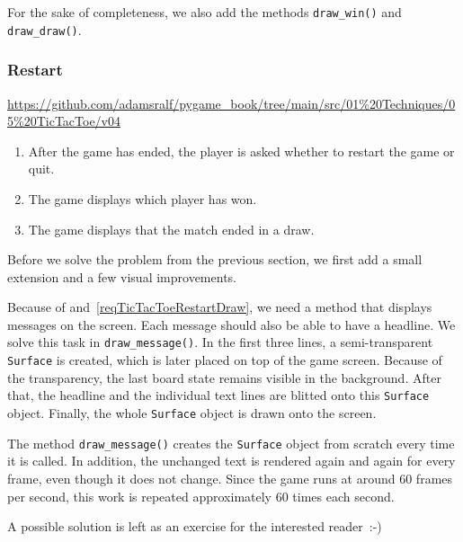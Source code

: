 For the sake of completeness, we also add the methods \texttt{draw\_win()} and \texttt{draw\_draw()}.



\subsubsection{Restart}
\begin{diskbox}
	\url{https://github.com/adamsralf/pygame_book/tree/main/src/01%20Techniques/05%20TicTacToe/v04}
\end{diskbox}

\begin{enumerate}
	\item After the game has ended, the player is asked whether to restart the game or quit.\label{reqTicTacToeRestartRestart}
	
	\item The game displays which player has won.\label{reqTicTacToeRestartWin}
	
	\item The game displays that the match ended in a draw.\label{reqTicTacToeRestartDraw}
\end{enumerate}
\er


Before we solve the problem from the previous section, we first add a small extension and a few visual improvements.

Because of  and~\ref{reqTicTacToeRestartDraw}, we need a method that displays messages on the screen. Each message should also be able to have a headline. We solve this task in \texttt{draw\_message()}. In the first three lines, a semi-transparent \texttt{Surface} is created, which is later placed on top of the game screen. Because of the transparency, the last board state remains visible in the background. After that, the headline and the individual text lines are blitted onto this \texttt{Surface} object. Finally, the whole \texttt{Surface} object is drawn onto the screen.


\begin{warningbox}
	
	The method \texttt{draw\_message()} creates the \texttt{Surface} object from scratch every time it is called. In addition, the unchanged text is rendered again and again for every frame, even though it does not change. Since the game runs at around 60 frames per second, this work is repeated approximately 60 times each second.
	
	A possible solution is left as an exercise for the interested reader~:-)
\end{warningbox}


